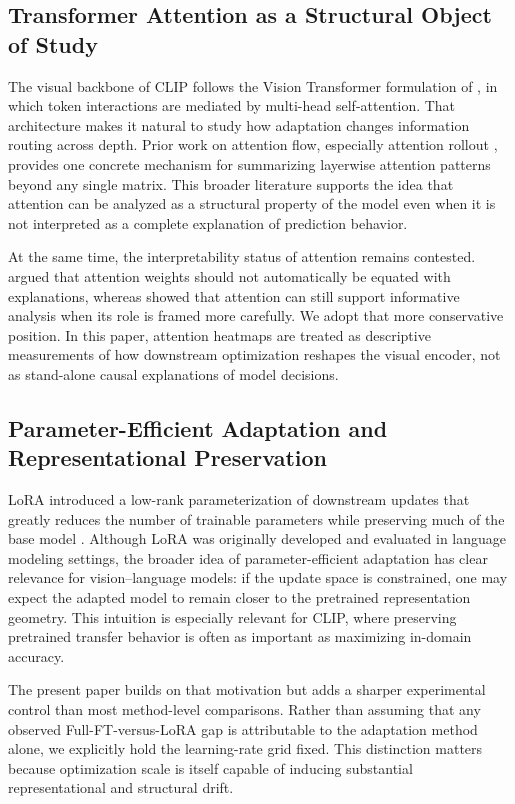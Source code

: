 \documentclass[10pt]{article}
\begin{document}
\subsection{Transformer Attention as a Structural Object of Study}
The visual backbone of CLIP follows the Vision Transformer formulation of \citet{dosovitskiy2021image}, in which token interactions are mediated by multi-head self-attention. That architecture makes it natural to study how adaptation changes information routing across depth. Prior work on attention flow, especially attention rollout \citep{abnar2020quantifying}, provides one concrete mechanism for summarizing layerwise attention patterns beyond any single matrix. This broader literature supports the idea that attention can be analyzed as a structural property of the model even when it is not interpreted as a complete explanation of prediction behavior.

At the same time, the interpretability status of attention remains contested. \citet{jain2019attention} argued that attention weights should not automatically be equated with explanations, whereas \citet{wiegreffe2019attention} showed that attention can still support informative analysis when its role is framed more carefully. We adopt that more conservative position. In this paper, attention heatmaps are treated as descriptive measurements of how downstream optimization reshapes the visual encoder, not as stand-alone causal explanations of model decisions.

\subsection{Parameter-Efficient Adaptation and Representational Preservation}
LoRA introduced a low-rank parameterization of downstream updates that greatly reduces the number of trainable parameters while preserving much of the base model \citep{hu2022lora}. Although LoRA was originally developed and evaluated in language modeling settings, the broader idea of parameter-efficient adaptation has clear relevance for vision--language models: if the update space is constrained, one may expect the adapted model to remain closer to the pretrained representation geometry. This intuition is especially relevant for CLIP, where preserving pretrained transfer behavior is often as important as maximizing in-domain accuracy.

The present paper builds on that motivation but adds a sharper experimental control than most method-level comparisons. Rather than assuming that any observed Full-FT-versus-LoRA gap is attributable to the adaptation method alone, we explicitly hold the learning-rate grid fixed. This distinction matters because optimization scale is itself capable of inducing substantial representational and structural drift.
\end{document}
